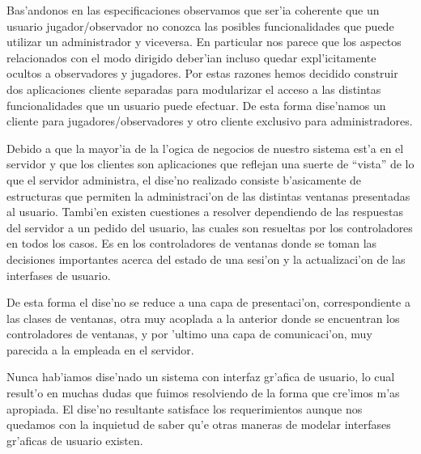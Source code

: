 Bas'andonos en las especificaciones observamos que ser'ia coherente que un usuario jugador/observador no conozca las posibles funcionalidades que puede utilizar un administrador y viceversa. En particular nos parece que los aspectos relacionados con el modo dirigido deber'ian incluso quedar expl'icitamente ocultos a observadores y jugadores. Por estas razones hemos decidido construir dos aplicaciones cliente separadas para modularizar el acceso a las distintas funcionalidades que un usuario puede efectuar. De esta forma dise'namos un cliente para jugadores/observadores y otro cliente exclusivo para administradores.

Debido a que la mayor'ia de la l'ogica de negocios de nuestro sistema est'a en el servidor y que los clientes son aplicaciones que reflejan una suerte de ``vista'' de lo que el servidor administra, el dise'no realizado consiste b'asicamente de estructuras que permiten la administraci'on de las distintas ventanas presentadas al usuario. Tambi'en existen cuestiones a resolver dependiendo de las respuestas del servidor a un pedido del usuario, las cuales son resueltas por los controladores en todos los casos. Es en los controladores de ventanas donde se toman las decisiones importantes acerca del estado de una sesi'on y la actualizaci'on de las interfases de usuario.

De esta forma el dise'no se reduce a una capa de presentaci'on, correspondiente a las clases de ventanas, otra muy acoplada a la anterior donde se encuentran los controladores de ventanas, y por 'ultimo una capa de comunicaci'on, muy parecida a la empleada en el servidor.

Nunca hab'iamos dise'nado un sistema con interfaz gr'afica de usuario, lo cual result'o en muchas dudas que fuimos resolviendo de la forma que cre'imos m'as apropiada. El dise'no resultante satisface los requerimientos aunque nos quedamos con la inquietud de saber qu'e otras maneras de modelar interfases gr'aficas de usuario existen.



